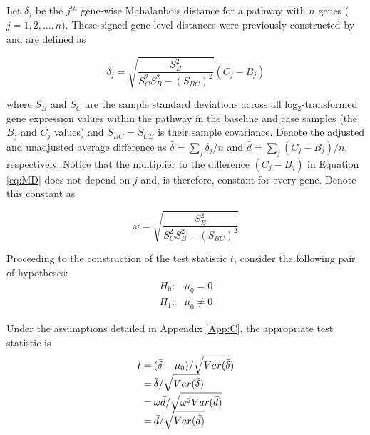 Let $\delta_{j}$ be the $j^{th}$ gene-wise Mahalanbois distance for a pathway with $n$ genes ($j = 1,2,\ldots,n$). These signed gene-level distances were previously constructed by \citet{Schissler2015} and are defined as

\begin{equation}
\label{eq:MD}
\delta_{j} = \sqrt{\frac{S^{2}_{B}}{S^{2}_{C}S^{2}_{B}-(S_{BC})^{2}}}(C_{j} - B_{j}) 
\end{equation}

\noindent where $S_{B}$ and $S_{C}$ are the sample standard deviations across all log$_{2}$-transformed gene expression values within the pathway in the baseline and case samples (the $B_{j}$ and $C_{j}$ values) and $S_{BC}=S_{CB}$ is their sample covariance. Denote the adjusted and unadjusted average difference as $\bar{\delta} = \sum_j \delta_j/n$ and $\bar{d} = \sum_j (C_{j} - B_{j})/n$, respectively. Notice that the multiplier to the difference $(C_{j} - B_{j})$ in Equation \ref{eq:MD} does not depend on $j$ and, is therefore, constant for every gene. Denote this constant as

\begin{equation}
\label{eq:coef}
\omega = \sqrt{\frac{S^{2}_{B}}{S^{2}_{C}S^{2}_{B}-(S_{BC})^{2}}}
\end{equation}

\noindent Proceeding to the construction of the test statistic $t$, consider the following pair of hypotheses:
\begin{equation}
  \label{eq:hypotheses}
\begin{array}{rl}
  H_{0}: & \mu_{0} = 0 \\
  H_{1}: & \mu_{0} \neq 0
\end{array}
\end{equation}

\noindent Under the assumptions detailed in Appendix \ref{App:C}, the appropriate test statistic is
\begin{equation}
  \label{eq:t}
  \arraycolsep=1.1pt\def\arraystretch{1.4}
\begin{array}{rl}
  t = & (\bar{\delta} - \mu_{0})/ \sqrt{Var(\bar{\delta}}) \\
  = & \bar{\delta}/ \sqrt{Var(\bar{\delta}}) \\
  = & \omega \bar{d}/ \sqrt{\omega^{2} Var(\bar{d})} \\
  = & \bar{d}/ \sqrt{ Var(\bar{d})} \\
\end{array}
\end{equation}


